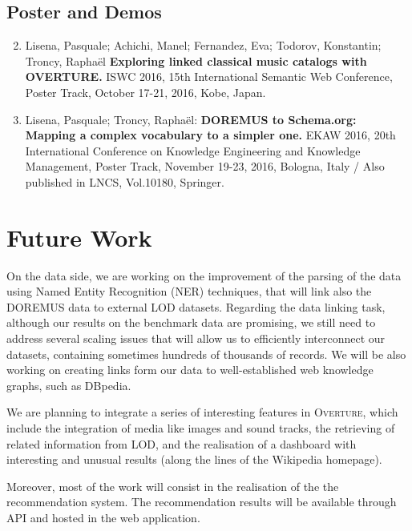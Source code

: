 \documentclass[a4paper,11pt]{report}
\begin{document}
\section*{Poster and Demos}
\begin{enumerate}
\setcounter{enumi}{1}

\item Lisena, Pasquale; Achichi, Manel; Fernandez, Eva; Todorov, Konstantin; Troncy, Rapha\"el
\textbf{Exploring linked classical music catalogs with OVERTURE.}
ISWC 2016, 15th International Semantic Web Conference, Poster Track, October 17-21, 2016, Kobe, Japan.

\item Lisena, Pasquale; Troncy, Rapha\"el:
\textbf{DOREMUS to Schema.org: Mapping a complex vocabulary to a simpler one.}
EKAW 2016, 20th International Conference on Knowledge Engineering and Knowledge Management, Poster Track, November 19-23, 2016, Bologna, Italy / Also published in LNCS, Vol.10180, Springer.

\end{enumerate}


\chapter*{Future Work}
\label{future}

On the data side, we are working on the improvement of the parsing of the data using Named Entity Recognition (NER) techniques, that will link also the DOREMUS data to external LOD datasets. Regarding the data linking task, although our results on the benchmark data are promising, we still need to address several scaling issues that will allow us to efficiently interconnect our datasets, containing sometimes hundreds of thousands of records. We will be also working on creating links form our data to well-established web knowledge graphs, such as DBpedia.

We are planning to integrate a series of interesting features in \textsc{Overture}, which include the integration of media like images and sound tracks, the retrieving of related information from LOD, and the realisation of a dashboard with interesting and unusual results (along the lines of the Wikipedia homepage). 

Moreover, most of the work will consist in the realisation of the the recommendation system. The recommendation results will be available through API and hosted in the web application.

{}

\end{document}
